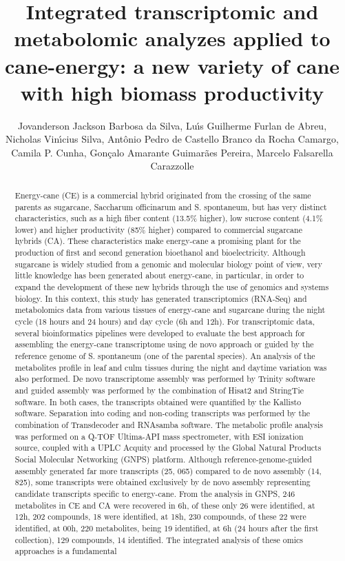 \documentclass[twoside]{article}
\title{\vspace{-15mm}\fontsize{24pt}{10pt}\selectfont\textbf{ Integrated transcriptomic and metabolomic analyzes applied to cane-energy: a new variety of cane with high biomass productivity }} %
\author{ Jovanderson Jackson Barbosa da Silva, Lu\'{\i}s Guilherme Furlan de Abreu, Nicholas Vin\'{\i}cius Silva, Ant\^onio Pedro de Castello Branco da Rocha Camargo, Camila P. Cunha, Gon\c{c}alo Amarante Guimar\~aes Pereira, Marcelo Falsarella Carazzolle }
\affil{ Universidade Estadual de Campinas }
\date{}
\begin{document}
  
  
  \maketitle %
  
  
  \thispagestyle{fancy} %
  
  
  \begin{abstract}
  Energy-cane (CE) is a commercial hybrid originated from the crossing of the same parents as sugarcane,  Saccharum officinarum and S. spontaneum,  but has very distinct characteristics,  such as a high fiber content (13.5\% higher),  low sucrose content (4.1\% lower) and higher productivity (85\% higher) compared to commercial sugarcane hybrids (CA). These characteristics make energy-cane a promising plant for the production of first and second generation bioethanol and bioelectricity. Although sugarcane is widely studied from a genomic and molecular biology point of view,  very little knowledge has been generated about energy-cane,  in particular,  in order to expand the development of these new hybrids through the use of genomics and systems biology. In this context,  this study has generated transcriptomics (RNA-Seq) and metabolomics data from various tissues of energy-cane and sugarcane during the night cycle (18 hours and 24 hours) and day cycle (6h and 12h). For transcriptomic data,  several bioinformatics pipelines were developed to evaluate the best approach for assembling the energy-cane transcriptome using de novo approach or guided by the reference genome of S. spontaneum (one of the parental species). An analysis of the metabolites profile in leaf and culm tissues during the night and daytime variation was also performed. De novo transcriptome assembly was performed by Trinity software and guided assembly was performed by the combination of Hisat2 and StringTie software. In both cases,  the transcripts obtained were quantified by the Kallisto software. Separation into coding and non-coding transcripts was performed by the combination of Transdecoder and RNAsamba software. The metabolic profile analysis was performed on a Q-TOF Ultima-API mass spectrometer,  with ESI ionization source,  coupled with a UPLC Acquity and processed by the Global Natural Products Social Molecular Networking (GNPS) platform. Although reference-genome-guided assembly generated far more transcripts (25, 065) compared to de novo assembly (14, 825),  some transcripts were obtained exclusively by de novo assembly representing candidate transcripts specific to energy-cane. From the analysis in GNPS,  246 metabolites in CE and CA were recovered in 6h,  of these only 26 were identified,  at 12h,  202 compounds,  18 were identified,  at 18h,  230 compounds,  of these 22 were identified,  at 00h,  220 metabolites,  being 19 identified,  at 6h (24 hours after the first collection),  129 compounds,  14 identified.  The integrated analysis of these omics approaches is a fundamental 
\end{abstract}
\end{document}
